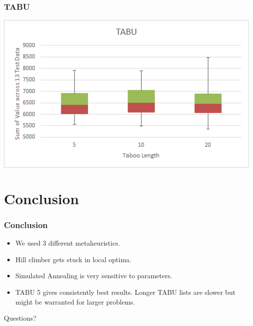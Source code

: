\documentclass{beamer}
\begin{document}
\begin{frame}
\frametitle{TABU}
 \centerline{\includegraphics[width=1.0\textwidth]{TABU2.png}}
\end{frame}

\section{Conclusion}
\begin{frame}
\frametitle{Conclusion}

\begin{itemize}
	\item We used 3 different metaheuristics.
	
	\item Hill climber gets stuck in local optima.
	
	\item Simulated Annealing is very sensitive to parameters.
	
	\item TABU 5 gives consistently best results. Longer TABU lists are slower but might be warranted for larger problems.
\end{itemize}
\end{frame}


\begin{frame}
\Huge{\centerline{Questions?
		}}
\end{frame}
\end{document}
